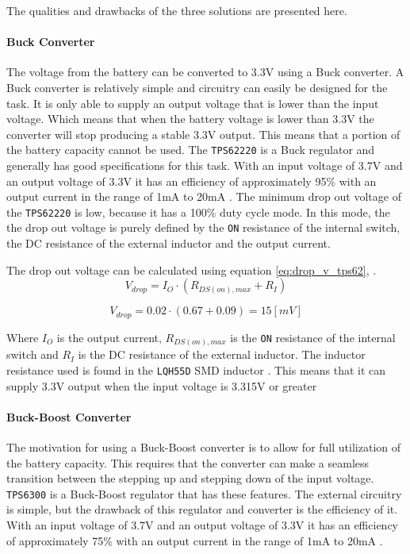 The qualities and drawbacks of the three solutions are presented here.

\paragraph{Buck Converter}
The voltage from the battery can be converted to 3.3V using a Buck converter.
A Buck converter is relatively simple and circuitry can easily be designed for the task.
It is only able to supply an output voltage that is lower than the input voltage.
Which means that when the battery voltage is lower than 3.3V the converter will stop producing a stable 3.3V output.
This means that a portion of the battery capacity cannot be used.
The \texttt{TPS62220} is a Buck regulator and generally has good specifications for this task. 
With an input voltage of 3.7V and an output voltage of 3.3V it has an efficiency of approximately 95\% with an output current in the range of 1mA to 20mA \cite{TPS6222}.
The minimum drop out voltage of the \texttt{TPS62220} is low, because it has a 100\% duty cycle mode.
In this mode, the the drop out voltage is purely defined by the \texttt{ON} resistance of the internal switch, the DC resistance of the external inductor and the output current.

The drop out voltage can be calculated using equation \ref{eq:drop_v_tps62}, \cite{TPS6222}.
\begin{equation}
	V_{drop} = I_{O} \cdot (R_{DS(on),max}+R_I)
	\label{eq:drop_v_tps62}
\end{equation}

\begin{equation}
	V_{drop} = 0.02 \cdot (0.67+0.09) = 15 [mV]
	\label{eq:drop_v_tps62_2}
\end{equation}

Where $I_O$ is the output current, $R_{DS(on),max}$ is the \texttt{ON} resistance of the internal switch and $R_I$ is the DC resistance of the external inductor.
The inductor resistance used is found in the \texttt{LQH55D} SMD inductor \cite{LQH55D}.
This means that it can supply 3.3V output when the input voltage is 3.315V or greater



\paragraph{Buck-Boost Converter}
The motivation for using a Buck-Boost converter is to allow for full utilization of the battery capacity.
This requires that the converter can make a seamless transition between the stepping up and stepping down of the input voltage. 
\texttt{TPS6300} is a Buck-Boost regulator that has these features.
The external circuitry is simple, but the drawback of this regulator and converter is the efficiency of it.
With an input voltage of 3.7V and an output voltage of 3.3V it has an efficiency of approximately 75\% with an output current in the range of 1mA to 20mA \cite{TPS6300}.

